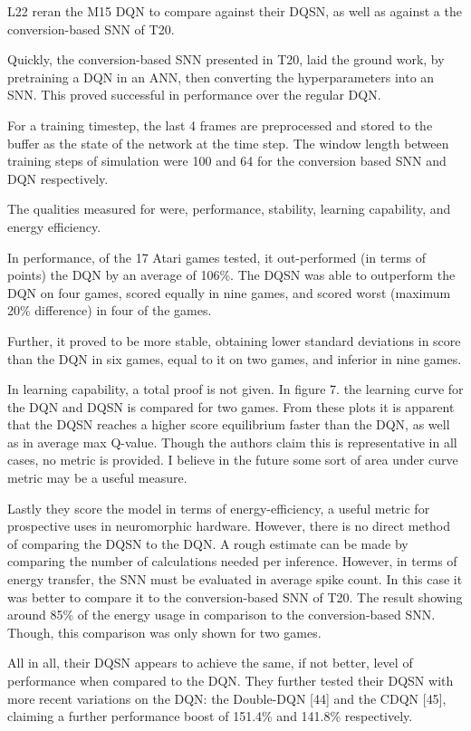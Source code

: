 L22 reran the M15 DQN to compare against their DQSN, as well as against
a the conversion-based SNN of T20.

Quickly, the conversion-based SNN presented in T20, laid the ground
work, by pretraining a DQN in an ANN, then converting the
hyperparameters into an SNN. This proved successful in performance over
the regular DQN.

For a training timestep, the last 4 frames are preprocessed and stored
to the buffer as the state of the network at the time step. The window
length between training steps of simulation were 100 and 64 for the
conversion based SNN and DQN respectively.

The qualities measured for were, performance, stability, learning
capability, and energy efficiency.

In performance, of the 17 Atari games tested, it out-performed (in terms
of points) the DQN by an average of 106\%. The DQSN was able to
outperform the DQN on four games, scored equally in nine games, and
scored worst (maximum 20\% difference) in four of the games.

Further, it proved to be more stable, obtaining lower standard
deviations in score than the DQN in six games, equal to it on two games,
and inferior in nine games.

In learning capability, a total proof is not given. In figure 7. the
learning curve for the DQN and DQSN is compared for two games. From
these plots it is apparent that the DQSN reaches a higher score
equilibrium faster than the DQN, as well as in average max Q-value.
Though the authors claim this is representative in all cases, no metric
is provided. I believe in the future some sort of area under curve
metric may be a useful measure.

Lastly they score the model in terms of energy-efficiency, a useful
metric for prospective uses in neuromorphic hardware. However, there is
no direct method of comparing the DQSN to the DQN. A rough estimate can
be made by comparing the number of calculations needed per inference.
However, in terms of energy transfer, the SNN must be evaluated in
average spike count. In this case it was better to compare it to the
conversion-based SNN of T20. The result showing around 85\% of the
energy usage in comparison to the conversion-based SNN. Though, this
comparison was only shown for two games.

All in all, their DQSN appears to achieve the same, if not better, level
of performance when compared to the DQN. They further tested their DQSN
with more recent variations on the DQN: the Double-DQN {[}44{]} and the
CDQN {[}45{]}, claiming a further performance boost of 151.4\% and
141.8\% respectively.


